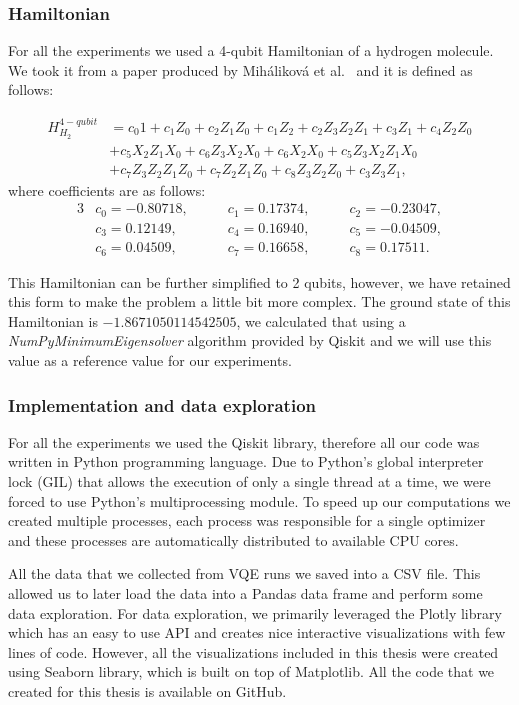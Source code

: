\subsubsection{Hamiltonian}
For all the experiments we used a 4-qubit Hamiltonian of a hydrogen molecule. We took it from a paper produced by Miháliková et al.~\cite{mihalikova} and it is defined as follows:

\begin{align*}H_{H_2}^{4-qubit} &= c_{0}1 + c_{1}Z_{0} + c_{2}Z_{1}Z_{0} + c_{1}Z_{2} + c_{2}Z_{3}Z_{2}Z_{1} + c_{3}Z_{1} + c_{4}Z_{2}Z_{0}\\
                                &+ c_{5}X_{2}Z_{1}X_{0} + c_{6}Z_{3}X_{2}X_{0} + c_{6}X_{2}X_{0} + c_{5}Z_{3}X_{2}Z_{1}X_{0}\\
                                &+c_{7}Z_{3}Z_{2}Z_{1}Z_{0} + c_{7}Z_{2}Z_{1}Z_{0} + c_{8}Z_{3}Z_{2}Z_{0} + c_{3}Z_{3}Z_{1},
\end{align*}
where coefficients are as follows:
\begin{alignat*}{3}
    &c_0 = -0.80718,\qquad &c_1 = 0.17374,\qquad &c_2 =-0.23047, \\
    &c_3 = 0.12149,\qquad  &c_4 = 0.16940,\qquad &c_5 = -0.04509, \\
    &c_6 = 0.04509,\qquad  &c_7 = 0.16658,\qquad &c_8 = 0.17511.
\end{alignat*}

This Hamiltonian can be further simplified to 2 qubits, however, we have retained this form to make the problem a little bit more complex. The ground state of this Hamiltonian is $-1.8671050114542505$, we calculated that using a \textit{NumPyMinimumEigensolver} algorithm provided by Qiskit and we will use this value as a reference value for our experiments.

\subsubsection{Implementation and data exploration}
For all the experiments we used the Qiskit library, therefore all our code was written in Python programming language. Due to Python's global interpreter lock (GIL) that allows the execution of only a single thread at a time, we were forced to use Python's multiprocessing module. To speed up our computations we created multiple processes, each process was responsible for a single optimizer and these processes are automatically distributed to available CPU cores.

All the data that we collected from VQE runs we saved into a CSV file. This allowed us to later load the data into a Pandas data frame and perform some data exploration. For data exploration, we primarily leveraged the Plotly library which has an easy to use API and creates nice interactive visualizations with few lines of code. However, all the visualizations included in this thesis were created using Seaborn library, which is built on top of Matplotlib. All the code that we created for this thesis is available on GitHub. 

